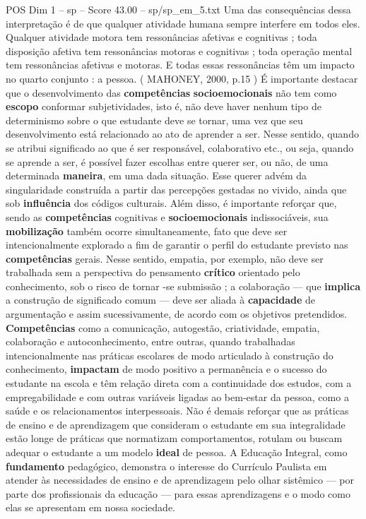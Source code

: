 \begin{textsample}{POS Dim 1 – sp – Score 43.00 – sp/sp\_em\_5.txt}
Uma das consequências dessa interpretação é de que qualquer atividade humana sempre interfere em todos eles.
Qualquer atividade motora tem ressonâncias afetivas e cognitivas ; toda disposição afetiva tem ressonâncias motoras e cognitivas ; toda operação mental tem ressonâncias afetivas e motoras.
E todas essas ressonâncias têm um impacto no quarto conjunto : a pessoa. ( MAHONEY, 2000, p.15 ) É importante destacar que o desenvolvimento das \textbf{competências} \textbf{socioemocionais} não tem como \textbf{escopo} conformar subjetividades, isto é, não deve haver nenhum tipo de determinismo sobre o que estudante deve se tornar, uma vez que seu desenvolvimento está relacionado ao ato de aprender a ser.
Nesse sentido, quando se atribui significado ao que é ser responsável, colaborativo etc., ou seja, quando se aprende a ser, é possível fazer escolhas entre querer ser, ou não, de uma determinada \textbf{maneira}, em uma dada situação.
Esse querer advém da singularidade construída a partir das percepções gestadas no vivido, ainda que sob \textbf{influência} dos códigos culturais.
Além disso, é importante reforçar que, sendo as \textbf{competências} cognitivas e \textbf{socioemocionais} indissociáveis, sua \textbf{mobilização} também ocorre simultaneamente, fato que deve ser intencionalmente explorado a fim de garantir o perfil do estudante previsto nas \textbf{competências} gerais.
Nesse sentido, empatia, por exemplo, não deve ser trabalhada sem a perspectiva do pensamento \textbf{crítico} orientado pelo conhecimento, sob o risco de tornar -se submissão ; a colaboração — que \textbf{implica} a construção de significado comum — deve ser aliada à \textbf{capacidade} de argumentação e assim sucessivamente, de acordo com os objetivos pretendidos. \textbf{Competências} como a comunicação, autogestão, criatividade, empatia, colaboração e autoconhecimento, entre outras, quando trabalhadas intencionalmente nas práticas escolares de modo articulado à construção do conhecimento, \textbf{impactam} de modo positivo a permanência e o sucesso do estudante na escola e têm relação direta com a continuidade dos estudos, com a empregabilidade e com outras variáveis ligadas ao bem-estar da pessoa, como a saúde e os relacionamentos interpessoais.
Não é demais reforçar que as práticas de ensino e de aprendizagem que consideram o estudante em sua integralidade estão longe de práticas que normatizam comportamentos, rotulam ou buscam adequar o estudante a um modelo \textbf{ideal} de pessoa.
A Educação Integral, como \textbf{fundamento} pedagógico, demonstra o interesse do Currículo Paulista em atender às necessidades de ensino e de aprendizagem pelo olhar sistêmico — por parte dos profissionais da educação — para essas aprendizagens e o modo como elas se apresentam em nossa sociedade.

\end{textsample}
